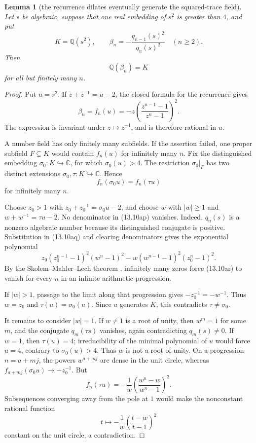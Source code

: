 \documentclass[11pt,reqno]{amsart}
\newtheorem{lemma}[theorem]{Lemma}
\theoremstyle{definition}
\theoremstyle{remark}
\newcommand{\C}{\mathbb C}
\newcommand{\Q}{\mathbb Q}
\begin{document}
\begin{lemma}[the recurrence dilates eventually generate the squared-trace field]
\label{lem:recurrence-field-stabilization}
Let \(s\) be algebraic, suppose that one real embedding of \(s^2\) is
greater than \(4\), and put
\[
 K=\Q(s^2),\qquad
 \beta_n=-\frac{q_{n-1}(s)^2}{q_n(s)^2}\quad(n\ge2).
\]
Then
\[
 \Q(\beta_n)=K
\]
for all but finitely many \(n\).
\end{lemma}

\begin{proof}
Put \(u=s^2\).  If \(z+z^{-1}=u-2\), the closed formula for the recurrence
gives
\[
 \beta_n=f_n(u)
 =-z\left(\frac{z^{n-1}-1}{z^n-1}\right)^2.
\tag{13.10ap}
\]
The expression is invariant under \(z\mapsto z^{-1}\), and is therefore
rational in \(u\).

A number field has only finitely many subfields.  If the assertion failed,
one proper subfield \(F\subsetneq K\) would contain \(f_n(u)\) for
infinitely many \(n\).  Fix the distinguished embedding
\(\sigma_0:K\hookrightarrow\C\), for which \(\sigma_0(u)>4\).
The restriction \(\sigma_0|_F\) has two distinct extensions
\(\sigma_0,\tau:K\hookrightarrow\C\).  Hence
\[
 f_n(\sigma_0u)=f_n(\tau u)
\tag{13.10aq}
\]
for infinitely many \(n\).

Choose \(z_0>1\) with
\(z_0+z_0^{-1}=\sigma_0u-2\), and choose \(w\) with
\(|w|\ge1\) and \(w+w^{-1}=\tau u-2\).  No denominator in
(13.10ap) vanishes.  Indeed, \(q_n(s)\) is a nonzero algebraic number
because its distinguished conjugate is positive.  Substitution in
(13.10aq) and clearing denominators gives the exponential polynomial
\[
 z_0(z_0^{n-1}-1)^2(w^n-1)^2
 -w(w^{n-1}-1)^2(z_0^n-1)^2.
\tag{13.10ar}
\]
By the Skolem--Mahler--Lech theorem \cite{Lech}, infinitely many zeros
force (13.10ar) to vanish for every \(n\) in an infinite arithmetic
progression.

If \(|w|>1\), passage to the limit along that progression gives
\(-z_0^{-1}=-w^{-1}\).  Thus \(w=z_0\) and
\(\tau(u)=\sigma_0(u)\).  Since \(u\) generates \(K\), this contradicts
\(\tau\ne\sigma_0\).

It remains to consider \(|w|=1\).  If \(w\ne1\) is a root of unity, then
\(w^m=1\) for some \(m\), and the conjugate \(q_m(\tau s)\) vanishes,
again contradicting \(q_m(s)\ne0\).  If \(w=1\), then
\(\tau(u)=4\); irreducibility of the minimal polynomial of \(u\) would
force \(u=4\), contrary to \(\sigma_0(u)>4\).  Thus \(w\) is not a root
of unity.  On a progression \(n=a+mj\), the powers \(w^{a+mj}\) are dense
in the unit circle, whereas \(f_{a+mj}(\sigma_0u)\to-z_0^{-1}\).
But
\[
 f_n(\tau u)
 =-\frac1w\left(\frac{w^n-w}{w^n-1}\right)^2.
\]
Subsequences converging away from the pole at \(1\) would make the
nonconstant rational function
\[
 t\longmapsto-\frac1w\left(\frac{t-w}{t-1}\right)^2
\]
constant on the unit circle, a contradiction.
\end{proof}
\end{document}
